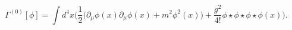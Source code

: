 \begin{equation}
 \label{action}
 \Gamma^{(0)}[\phi] = \int d^4x\Big(\frac12\big(\partial_\mu\phi(x)
 \partial_\mu\phi(x) +
 m^2\phi^2(x)\big) + \frac{g^2}{4!}\phi\star\phi\star\phi\star\phi(x)\Big).
\end{equation}

